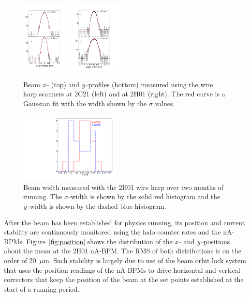 \begin{figure}[ht]
\begin{center}
\includegraphics[width=0.23\textwidth]{2C21_fits.pdf}
\includegraphics[width=0.23\textwidth]{2H01_fits.pdf}
\caption{Beam {\it x--} (top) and {\it y--}profiles (bottom) measured using the wire harp scanners at 2C21
  (left) and at 2H01 (right). The red curve is a Gaussian fit with the width shown by the $\sigma$ values.}
\label{fig:profile}
\end{center}
\end{figure}

\begin{figure}[ht]
\begin{center}
\includegraphics[width=0.45\textwidth]{BeamWidth.pdf}
\caption{Beam width measured with the 2H01 wire harp over two months of running. The {\it x--}width is
  shown by the solid red histogram and the {\it y--}width is shown by the dashed blue histogram.}
\label{fig:prof2h01}
\end{center}
\end{figure}

After the beam has been established for physics running, its position and current stability are continuously
monitored using the halo counter rates and the nA-BPMs. Figure~\ref{fig:position} shows the distribution of the
{\it x--} and {\it y--}positions about the mean at the 2H01 nA-BPM. The RMS of both distributions is on the order
of 20~$\mu$m. Such stability is largely due to use of the beam orbit lock system that uses the position readings of
the nA-BPMs to drive horizontal and vertical correctors that keep the position of the beam at the set points
established at the start of a running period.

